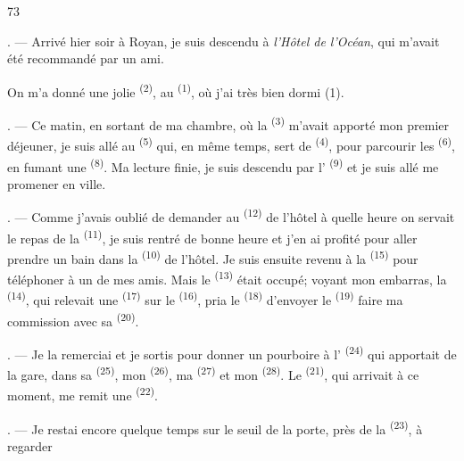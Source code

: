 \begin{VUpage}[75]{73}

\VUsaut{3.0mm}
\VUsaut{1.4mm}
\VUsaut{2.2mm}
\VUfilet{20mm}
\VUsaut{6.4mm}

. --- Arrivé hier soir à Royan, je suis descendu\nl
à \textit{l'Hôtel de l'Océan}, qui m'avait été recommandé par\nl
un ami.

\VUblancAlinea
On m'a donné une jolie  \textsuperscript{(2)}, au \nl
{} \textsuperscript{(1)}, où j'ai très bien dormi (1).

. --- Ce matin, en sortant de ma chambre, où la\nl
{} \textsuperscript{(3)} m'avait apporté mon premier déjeuner, je\nl
suis allé au  \textsuperscript{(5)} qui, en même temps, sert de\nl
{} \textsuperscript{(4)}, pour parcourir les \cc
{} \textsuperscript{(6)}, en fumant une  \textsuperscript{(8)}. Ma lecture\nl
finie, je suis descendu par l' \textsuperscript{(9)} et je suis\nl
allé me promener en ville.

. --- Comme j'avais oublié de demander au \cc
{} \textsuperscript{(12)} de l'hôtel à quelle heure on servait le repas\nl
de la  \textsuperscript{(11)}, je suis rentré de bonne heure\nl
et j'en ai profité pour aller prendre un bain dans la\nl
{} \textsuperscript{(10)} de l'hôtel. Je suis ensuite revenu à\nl
la  \textsuperscript{(15)} pour téléphoner à un de mes amis. Mais\nl
le  \textsuperscript{(13)} était occupé; voyant mon embarras,\nl
la \textsuperscript{(14)}, qui relevait une  \textsuperscript{(17)} sur le \nl
{} \textsuperscript{(16)}, pria le \textsuperscript{(18)} d'envoyer\nl
le  \textsuperscript{(19)} faire ma commission avec sa \cc
{} \textsuperscript{(20)}.

. --- Je la remerciai et je sortis pour donner un\nl
pourboire à l' \textsuperscript{(24)} qui apportait de\nl
la gare, dans sa  \textsuperscript{(25)}, mon \nl
{} \textsuperscript{(26)}, ma  \textsuperscript{(27)} et mon  \textsuperscript{(28)}.\nl
Le  \textsuperscript{(21)}, qui arrivait à ce moment, me remit\nl
une  \textsuperscript{(22)}.

. --- Je restai encore quelque temps sur le seuil de\nl
la porte, près de la  \textsuperscript{(23)}, à regarder
\parplein
\end{VUpage}

